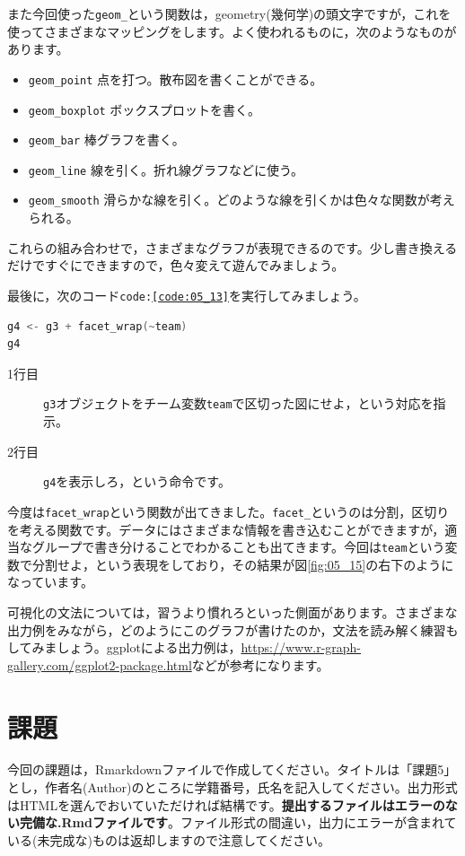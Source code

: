 \documentclass{ltjsbook}
\begin{document}
また今回使った\verb|geom_|という関数は，geometry(幾何学)の頭文字ですが，これを使ってさまざまなマッピングをします。よく使われるものに，次のようなものがあります。
\begin{itemize}
	\item \verb|geom_point| 点を打つ。散布図を書くことができる。
	\item \verb|geom_boxplot| ボックスプロットを書く。
	\item \verb|geom_bar| 棒グラフを書く。
	\item \verb|geom_line| 線を引く。折れ線グラフなどに使う。
	\item \verb|geom_smooth| 滑らかな線を引く。どのような線を引くかは色々な関数が考えられる。
\end{itemize}
これらの組み合わせで，さまざまなグラフが表現できるのです。少し書き換えるだけですぐにできますので，色々変えて遊んでみましょう。

最後に，次のコード\texttt{code:\ref{code:05_13}}を実行してみましょう。
\begin{lstlisting}[language=c++,label={code:05_13},caption={チームごとに分割}]
g4 <- g3 + facet_wrap(~team)
g4
\end{lstlisting}

\begin{description}
	\item[1行目] \texttt{g3}オブジェクトをチーム変数\verb|team|で区切った図にせよ，という対応を指示。
	\item[2行目] \texttt{g4}を表示しろ，という命令です。
\end{description}

今度は\verb|facet_wrap|という関数が出てきました。\verb|facet_|というのは分割，区切りを考える関数です。データにはさまざまな情報を書き込むことができますが，適当なグループで書き分けることでわかることも出てきます。今回は\verb|team|という変数で分割せよ，という表現をしており，その結果が図\ref{fig:05_15}の右下のようになっています。

可視化の文法については，習うより慣れろといった側面があります。さまざまな出力例をみながら，どのようにこのグラフが書けたのか，文法を読み解く練習もしてみましょう。ggplotによる出力例は，\url{https://www.r-graph-gallery.com/ggplot2-package.html}などが参考になります。

\section{課題}
今回の課題は，Rmarkdownファイルで作成してください。タイトルは「課題5」とし，作者名(Author)のところに学籍番号，氏名を記入してください。出力形式はHTMLを選んでおいていただければ結構です。\textbf{提出するファイルはエラーのない完備な.Rmdファイルです}。ファイル形式の間違い，出力にエラーが含まれている(未完成な)ものは返却しますので注意してください。
\end{document}
